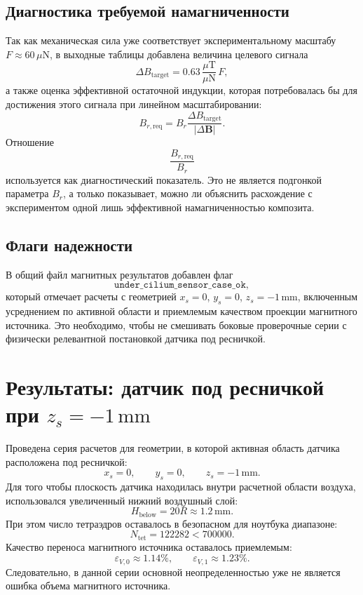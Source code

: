 \documentclass[12pt,a4paper]{article}
\begin{document}
\subsection*{Диагностика требуемой намагниченности}

Так как механическая сила уже соответствует экспериментальному масштабу
\(F\approx 60\,\mu\mathrm{N}\), в выходные таблицы добавлена величина целевого
сигнала
\[
    \Delta B_{\mathrm{target}}
    =
    0.63\,\frac{\mu\mathrm{T}}{\mu\mathrm{N}}\,F,
\]
а также оценка эффективной остаточной индукции, которая потребовалась бы для
достижения этого сигнала при линейном масштабировании:
\[
    B_{r,\mathrm{req}}
    =
    B_r
    \frac{\Delta B_{\mathrm{target}}}{|\Delta\mathbf B|}.
\]
Отношение
\[
    \frac{B_{r,\mathrm{req}}}{B_r}
\]
используется как диагностический показатель. Это не является подгонкой
параметра \(B_r\), а только показывает, можно ли объяснить расхождение с
экспериментом одной лишь эффективной намагниченностью композита.

\subsection*{Флаги надежности}

В общий файл магнитных результатов добавлен флаг
\[
    \texttt{under\_cilium\_sensor\_case\_ok},
\]
который отмечает расчеты с геометрией \(x_s=0\), \(y_s=0\),
\(z_s=-1\,\mathrm{mm}\), включенным усреднением по активной области и
приемлемым качеством проекции магнитного источника. Это необходимо, чтобы не
смешивать боковые проверочные серии с физически релевантной постановкой
датчика под ресничкой.

\section{Результаты: датчик под ресничкой при \(z_s=-1\,\mathrm{mm}\)}

Проведена серия расчетов для геометрии, в которой активная область датчика
расположена под ресничкой:
\[
    x_s=0,\qquad y_s=0,\qquad z_s=-1\,\mathrm{mm}.
\]
Для того чтобы плоскость датчика находилась внутри расчетной области воздуха,
использовался увеличенный нижний воздушный слой:
\[
    H_{\mathrm{below}}=20R\approx 1.2\,\mathrm{mm}.
\]
При этом число тетраэдров оставалось в безопасном для ноутбука диапазоне:
\[
    N_{\mathrm{tet}}=122282 < 700000.
\]
Качество переноса магнитного источника оставалось приемлемым:
\[
    \varepsilon_{V,0}\approx 1.14\%,
    \qquad
    \varepsilon_{V,1}\approx 1.23\%.
\]
Следовательно, в данной серии основной неопределенностью уже не является
ошибка объема магнитного источника.
\end{document}
